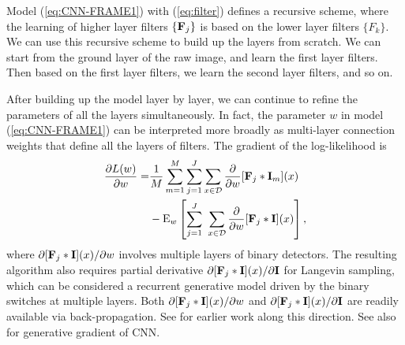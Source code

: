 \documentclass[letterpaper]{article}
\def\E{{\rm E}}
\def\I{{\bf I}}
\def\F{{\bf F}}
\begin{document}
Model (\ref{eq:CNN-FRAME1}) with (\ref{eq:filter}) defines a recursive scheme, where the learning of higher layer filters $\{\F_j\}$ is based on the lower layer filters $\{F_k\}$.  We can use this recursive scheme to build up the layers from scratch. We can start from the ground  layer of the raw image, and learn the first layer filters. Then based on the first layer filters, we learn the second layer filters, and so on.  

After building up the model layer by layer, we can continue to refine the parameters of all the layers simultaneously. In fact, the parameter $w$ in model (\ref{eq:CNN-FRAME1}) can be interpreted more broadly as multi-layer connection weights that define all the layers of filters. The gradient of the log-likelihood is 
\begin{equation}
\begin{aligned}
\frac{\partial L(w)}{\partial w} =& \frac{1}{M} \sum_{m=1}^{M}  \sum_{j=1}^{J} \sum_{x \in {\cal D}} \frac{\partial}{\partial w} [\F_j*\I_m](x) \\
      &   -  \E_{w} \left[  \sum_{j=1}^{J} \ \sum_{x \in {\cal D}} \frac{\partial}{\partial w} [\F_j*\I](x)\right], 
\end{aligned}
\label{eq:generativeGradient1}
\end{equation}
where $\partial [\F_j*\I](x)/\partial w$ involves multiple layers of binary detectors. The resulting algorithm also requires partial derivative $\partial [\F_j *\I](x)/\partial \I$ for Langevin sampling, which can be considered a recurrent generative model driven by the binary switches at multiple layers.  Both $\partial [\F_j *\I](x)/\partial w$ and $\partial [\F_j *\I](x)/\partial \I$  are readily available via back-propagation. See \cite{hinton2006unsupervised, Ng2011} for earlier work along this direction.  See also   \cite{Dai2015ICLR} for generative gradient of CNN. 
\end{document}
